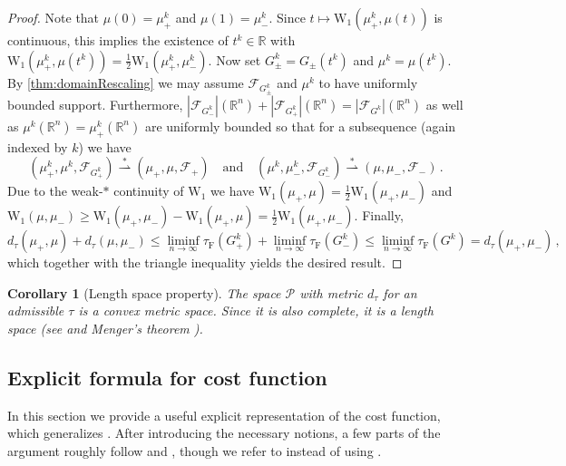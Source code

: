 \documentclass[10pt,a4paper,oneside,final]{article}
\newcommand{\R}{{\mathbb{R}}}
\newcommand{\fbm}{{\mathrm{fbm}}}
\newcommand{\prob}{{\mathcal{P}}}
\newcommand{\weakstarto}{\stackrel{*}{\rightharpoonup}}
\newcommand{\Wd}[1]{\mathrm{W}_{#1}}
\newcommand{\Wdone}{\Wd{1}}
\newcommand{\flux}{{\mathcal{F}}}
\newcommand{\JEnXia}[1][\tau]{#1_{\mathrm{F}}}%
\newcommand{\dtau}{d_\tau}
\numberwithin{equation}{section}
\theoremstyle{plain}
\newtheorem{corollary}[theorem]{Corollary}
\theoremstyle{definition}
\theoremstyle{remark}
\newtheorem{remark}[theorem]{Remark}
\newcommand{\notinclude}[1]{}
\begin{document}
\begin{proof}
Note that $\mu(0)=\mu_+^k$ and $\mu(1)=\mu_-^k$.
Since $t\mapsto\Wdone(\mu_+^k,\mu(t))$ is continuous, this implies the existence of $t^k\in\R$ with $\Wdone(\mu_+^k,\mu(t^k))=\frac12\Wdone(\mu_+^k,\mu_-^k)$.
Now set $G_\pm^k=G_\pm(t^k)$ and $\mu^k=\mu(t^k)$.
By \cref{thm:domainRescaling} we may assume $\flux_{G_\pm^k}$ and $\mu^k$ to have uniformly bounded support.
Furthermore, $|\flux_{G_-^k}|(\R^n)+|\flux_{G_+^k}|(\R^n)=|\flux_{G^k}|(\R^n)$ as well as $\mu^k(\R^n)=\mu_+^k(\R^n)$ are uniformly bounded
so that for a subsequence (again indexed by $k$) we have
\begin{equation*}
(\mu_+^k,\mu^k,\flux_{G_+^k})\weakstarto(\mu_+,\mu,\flux_+)
\quad\text{and}\quad
(\mu^k,\mu_-^k,\flux_{G_-^k})\weakstarto(\mu,\mu_-,\flux_-)\,.
\end{equation*}
Due to the weak-$*$ continuity of $\Wdone$ we have $\Wdone(\mu_+,\mu)=\frac12\Wdone(\mu_+,\mu_-)$ and $\Wdone(\mu,\mu_-)\geq\Wdone(\mu_+,\mu_-)-\Wdone(\mu_+,\mu)=\frac12\Wdone(\mu_+,\mu_-)$.
Finally,
\begin{equation*}
\dtau(\mu_+,\mu)+\dtau(\mu,\mu_-)\leq\liminf_{n\to\infty}\JEnXia(G_+^k)+\liminf_{n\to\infty}\JEnXia(G_-^k)\leq\liminf_{n\to\infty}\JEnXia(G^k)=\dtau(\mu_+,\mu_-)\,,
\end{equation*}
which together with the triangle inequality yields the desired result.
\end{proof}

\begin{corollary}[Length space property]\label{thm:lengthSpaceProperty}
The space $\prob$ with metric $\dtau$ for an admissible $\tau$ is a convex metric space.
Since it is also complete, it is a length space (see \cite[Def.\,14.1 \& Thm.\,14.1]{MR0268781} and Menger's theorem \cite[p.\,24]{MR1074005}).
\notinclude{\url{https://en.wikipedia.org/wiki/Convex_metric_space};\url{https://en.wikipedia.org/wiki/Intrinsic_metric} and examples therein}
\end{corollary}


\subsection{Explicit formula for cost function}
In this section we provide a useful explicit representation of the cost function, which generalizes \cite[Prop.\,4.4]{Xia-Interior-Regularity}.
After introducing the necessary notions, a few parts of the argument roughly follow \cite{Xia-Interior-Regularity} and \cite{CoRoMa17}, though we refer to \cite[Thm.\,8.1]{Wh99} instead of using \cite[Thm.\,2.7]{Xia-Interior-Regularity}.
\end{document}
